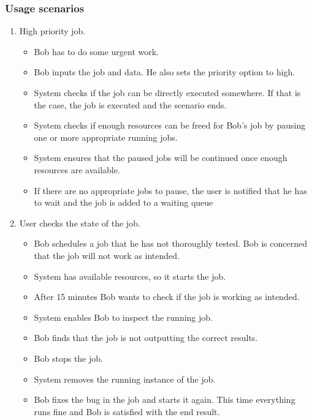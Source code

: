 \subsubsection{Usage scenarios}
\begin{enumerate}
  \item High priority job.
  \begin{itemize}
    \item Bob has to do some urgent work.
    \item Bob inputs the job and data. He also sets the priority option to high.
    \item System checks if the job can be directly executed somewhere.
    If that is the case, the job is executed and the scenario ends.
    \item System checks if enough resources can be freed for Bob's job by pausing one or more appropriate running jobs.
    \item System ensures that the paused jobs will be continued once enough resources are available.
    \item If there are no appropriate jobs to pause, the user is notified that he has to wait and the job is added to a waiting queue
  \end{itemize}
  \item User checks the state of the job.
  \begin{itemize}
    \item Bob schedules a job that he has not thoroughly tested.
    Bob is concerned that the job will not work as intended.
    \item System has available resources, so it starts the job.
    \item After 15 minutes Bob wants to check if the job is working as intended.
    \item System enables Bob to inspect the running job.
    \item Bob finds that the job is not outputting the correct results.
    \item Bob stops the job.
    \item System removes the running instance of the job.
    \item Bob fixes the bug in the job and starts it again.
    This time everything runs fine and Bob is satisfied with the end result.
  \end{itemize}
\end{enumerate}
